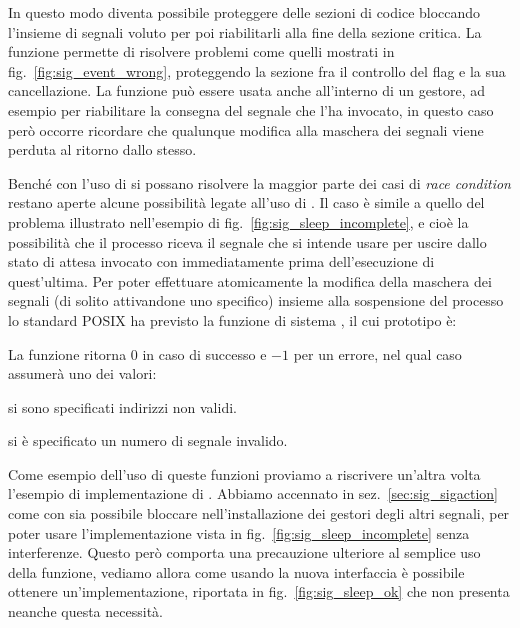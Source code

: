 In questo modo diventa possibile proteggere delle sezioni di codice bloccando
l'insieme di segnali voluto per poi riabilitarli alla fine della sezione
critica. La funzione permette di risolvere problemi come quelli mostrati in
fig.~\ref{fig:sig_event_wrong}, proteggendo la sezione fra il controllo del
flag e la sua cancellazione.  La funzione può essere usata anche all'interno
di un gestore, ad esempio per riabilitare la consegna del segnale che l'ha
invocato, in questo caso però occorre ricordare che qualunque modifica alla
maschera dei segnali viene perduta al ritorno dallo stesso.

Benché con l'uso di  si possano risolvere la maggior parte
dei casi di \textit{race condition} restano aperte alcune possibilità legate
all'uso di .  Il caso è simile a quello del problema illustrato
nell'esempio di fig.~\ref{fig:sig_sleep_incomplete}, e cioè la possibilità che
il processo riceva il segnale che si intende usare per uscire dallo stato di
attesa invocato con  immediatamente prima dell'esecuzione di
quest'ultima. Per poter effettuare atomicamente la modifica della maschera dei
segnali (di solito attivandone uno specifico) insieme alla sospensione del
processo lo standard POSIX ha previsto la funzione di sistema
, il cui prototipo è:

\begin{funcproto}{
}

{La funzione ritorna $0$ in caso di successo e $-1$ per un errore, nel qual
  caso  assumerà uno dei valori: 
  \begin{errlist}
  \item[\errcode{EFAULT}] si sono specificati indirizzi non validi.
  \item[\errcode{EINVAL}] si è specificato un numero di segnale invalido.
  \end{errlist}
}
\end{funcproto}

Come esempio dell'uso di queste funzioni proviamo a riscrivere un'altra volta
l'esempio di implementazione di . Abbiamo accennato in
sez.~\ref{sec:sig_sigaction} come con  sia possibile bloccare
 nell'installazione dei gestori degli altri segnali, per poter
usare l'implementazione vista in fig.~\ref{fig:sig_sleep_incomplete} senza
interferenze.  Questo però comporta una precauzione ulteriore al semplice uso
della funzione, vediamo allora come usando la nuova interfaccia è possibile
ottenere un'implementazione, riportata in fig.~\ref{fig:sig_sleep_ok} che non
presenta neanche questa necessità.

